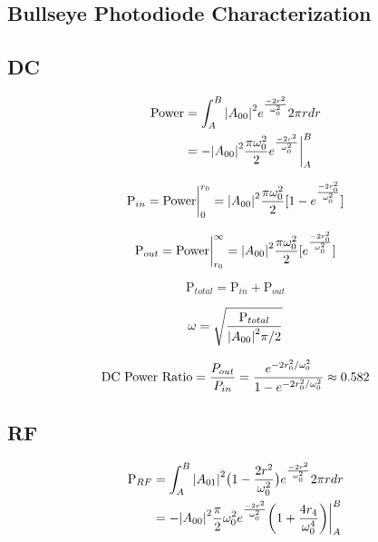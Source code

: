 \documentclass[10pt,a4paper]{book}
\begin{document}
\begin{appendices}
	\chapter{Bullseye Photodiode Characterization}
	
	\section{DC}
	\begin{equation}
	\begin{split}
	\text{Power} &= \int_{A}^{B} \abs{A_{00}}^2e^{\frac{-2r^2}{\omega_{0}^2}} 2\pi r dr\\
			&= -\abs{A_{00}}^2 \frac{\pi \omega_{0}^2}{2} e^{\frac{-2r^2}{\omega_{0}^2}} \biggr\rvert_A^B
	\end{split}
	\end{equation}
	
	\begin{equation}
	\text{P}_{in} = \text{Power} \biggr\rvert_0^{r_0} = \abs{A_{00}}^2 \frac{\pi \omega_{0}^2}{2} [1 - e^{\frac{-2r_0^2}{\omega_{0}^2}}]
	\end{equation}
	
	\begin{equation}
	\text{P}_{out} = \text{Power} \biggr\rvert_{r_0}^{\infty} = \abs{A_{00}}^2 \frac{\pi \omega_{0}^2}{2} [e^{\frac{-2r_0^2}{\omega_{0}^2}}]
	\end{equation}
	
	\begin{equation}
	\text{P}_{total} =  \text{P}_{in} + \text{P}_{out}
	\end{equation}
	
	\begin{equation}
	\omega = \sqrt{\frac{\text{P}_{total}}{\abs{A_{00}}^2 \pi / 2}}
	\end{equation}
	
	\begin{equation}
	\text{DC Power Ratio} 
	= \frac{P_{out}}{P_{in}} \\
	= \frac{e^{-2r_0^2/ \omega_{0}^2}} {1 - e^{-2r_0^2/ \omega_{0}^2 }} \approx 0.582
	\end{equation}
	
	\section{RF}
	
	\begin{equation}
	\begin{split}
	\text{P}_{RF} &= \int_{A}^{B} \abs{A_{01}}^2 \big(1-\frac{2r^2}{\omega_{0}^2}\big) e^{\frac{-2r^2}{\omega_{0}^2}} 2\pi r dr\\
	&= -\abs{A_{00}}^2 \frac{\pi}{2} \omega_{0}^2 e^{\frac{-2r^2}{\omega_{0}^2}} \bigg(1 + \frac{4 r_4}{\omega_{0}^4} \bigg)  \biggr\rvert_A^B
	\end{split}
	\end{equation}
	

\end{appendices}
\end{document}
